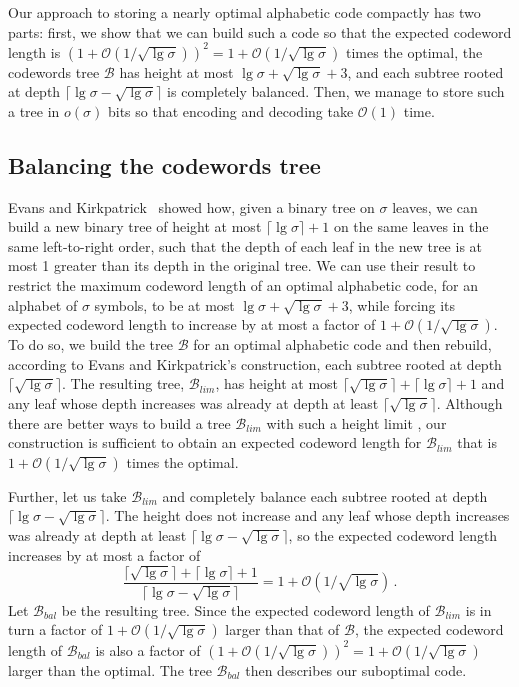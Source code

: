 \documentclass[preprint,12pt]{elsarticle}
\newcommand{\Oh}[1]{\ensuremath{\mathcal{O}\!\left({#1}\right)}}
\newcommand{\B}{\mathcal{B}}
\renewcommand{\log}{\lg}
\begin{document}
Our approach to storing a nearly optimal alphabetic code compactly has two parts: first, we show that we can build such a code so that the expected codeword length is \(\left(1 + \Oh{1 / \sqrt{\log \sigma}}\right)^2 = 1 + \Oh{1 / \sqrt{\log \sigma}}\) times the optimal, the codewords tree $\B$ has height at most \(\lg \sigma + \sqrt{\lg \sigma} + 3\), and each subtree rooted at depth \(\lceil \lg \sigma  - \sqrt{\lg \sigma} \rceil\) is completely balanced. Then, we manage to store such a tree in \(o (\sigma)\) bits so that encoding and decoding take $\Oh{1}$ time.

\subsection{Balancing the codewords tree}

Evans and Kirkpatrick~\cite{EK04} showed how, given a binary tree on $\sigma$ leaves, we can build a new binary tree of height at most \(\lceil \lg \sigma \rceil + 1\) on the same leaves in the same left-to-right order, such that the depth of each leaf in the new tree is at most 1 greater than its depth in the original tree. We can use their result to restrict the maximum codeword length of an optimal alphabetic code, for an alphabet of $\sigma$ symbols, to be at most \(\lg \sigma + \sqrt{\lg \sigma} + 3\), while forcing its expected codeword length to increase by at most a factor of \(1 + \Oh{1 / \sqrt{\log \sigma}}\). To do so, we build the tree $\B$ for an optimal alphabetic code and then rebuild, according to Evans and Kirkpatrick's construction, each subtree rooted at depth \(\lceil \sqrt{\lg \sigma} \rceil\).  The resulting tree, $\B_{lim}$, has height at most \(\lceil \sqrt{\lg \sigma} \rceil + \lceil \lg \sigma \rceil + 1\) and any leaf whose depth increases was already at depth at least \(\lceil \sqrt{\lg \sigma} \rceil\).
Although there are better ways to build a tree $\B_{lim}$ with such a height 
limit \cite{Wes76,Ita76}, our construction is sufficient to obtain an 
expected codeword length for $\B_{lim}$ that is \(1 + \Oh{1 /
\sqrt{\log \sigma}}\) times the optimal.

Further, let us take $\B_{lim}$ and completely balance each subtree rooted at depth \(\lceil \lg \sigma  - \sqrt{\lg \sigma} \rceil\).
The height does not increase and any leaf whose depth increases was already at depth at least \(\lceil \lg \sigma - \sqrt{\lg \sigma} \rceil\), so the expected codeword length increases by at most a factor of
\[\frac{\lceil\sqrt{\lg \sigma}\rceil + \lceil\lg\sigma\rceil + 1}{\lceil \lg \sigma - \sqrt{\lg \sigma} \rceil}
= 1 + \Oh{1 / \sqrt{\log \sigma}}\,.\]
Let $\B_{bal}$ be the resulting tree.  Since the expected codeword length of $\B_{lim}$ is in turn a factor of \(1 + \Oh{1 / \sqrt{\log \sigma}}\) larger than that of $\B$, the expected codeword length of $\B_{bal}$ is also a factor of \(\left(1 + \Oh{1 / \sqrt{\log \sigma}}\right)^2 = 1 + \Oh{1 / \sqrt{\log \sigma}}\) larger than
the optimal. The tree $\B_{bal}$ then describes our suboptimal code.
\end{document}

